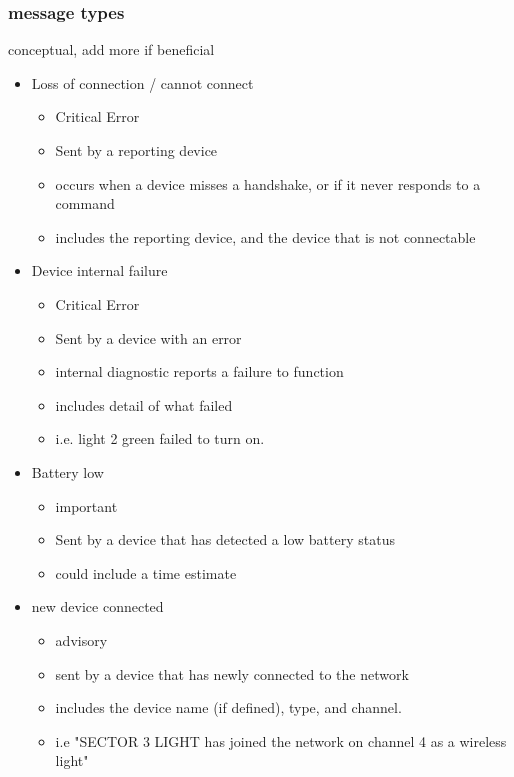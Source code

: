 \documentclass{article}
\begin{document}
     \subsubsection{message types}
     conceptual, add more if beneficial
     \begin{itemize}
     	\item Loss of connection / cannot connect
     	\begin{itemize}
     		\item Critical Error
     		\item Sent by a reporting device
     		\item occurs when a device misses a handshake, or if it never responds to a command
     		\item includes the reporting device, and the device that is not connectable
     	\end{itemize}
     	\item Device internal failure
     	\begin{itemize}
     		\item Critical Error
     		\item Sent by a device with an error
     		\item internal diagnostic reports a failure to function
     		\item includes detail of what failed
     		\item i.e. light 2 green failed to turn on.
     	\end{itemize}
     	\item Battery low
     	\begin{itemize}
     		\item important
     		\item Sent by a device that has detected a low battery status
     		\item could include a time estimate
     	\end{itemize}
     	\item new device connected
     	\begin{itemize}
     		\item advisory
     		\item sent by a device that has newly connected to the network
     		\item includes the device name (if defined), type, and channel.
     		\item i.e "SECTOR 3 LIGHT has joined the network on channel 4 as a wireless light"
     	\end{itemize}
     	
     \end{itemize}
\end{document}
